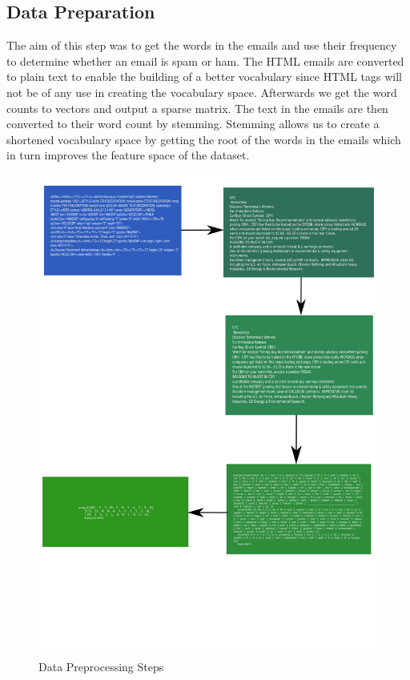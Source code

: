 \subsection{Data Preparation}
The aim of this step was to get the words in the emails and use their frequency to determine whether an email is spam or ham. The HTML emails are converted to plain text to enable the building of a better vocabulary since HTML tags will not be of any use in creating the vocabulary space. Afterwards we get the word counts to vectors and output a sparse matrix. The text in the emails are then converted to their word count by stemming. Stemming allows us to create a shortened vocabulary space by getting the root of the words in the emails which in turn improves the feature space of the dataset.
\begin{figure}[H]
    \centering
    \includegraphics[width=13cm]{img/preprocessing.png}
    \caption{Data Preprocessing Steps}
    \label{fig:hybrid}
\end{figure}
